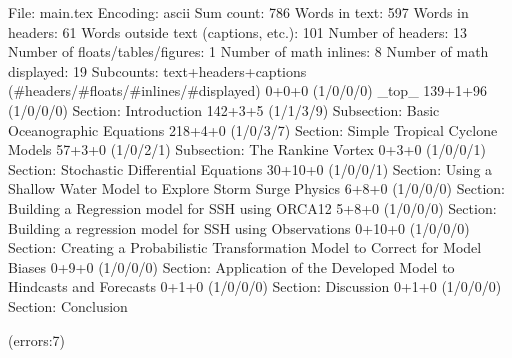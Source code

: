 
File: main.tex
Encoding: ascii
Sum count: 786
Words in text: 597
Words in headers: 61
Words outside text (captions, etc.): 101
Number of headers: 13
Number of floats/tables/figures: 1
Number of math inlines: 8
Number of math displayed: 19
Subcounts:
  text+headers+captions (#headers/#floats/#inlines/#displayed)
  0+0+0 (1/0/0/0) _top_
  139+1+96 (1/0/0/0) Section: Introduction
  142+3+5 (1/1/3/9) Subsection: Basic Oceanographic Equations
  218+4+0 (1/0/3/7) Section: Simple Tropical Cyclone Models
  57+3+0 (1/0/2/1) Subsection: The Rankine Vortex
  0+3+0 (1/0/0/1) Section: Stochastic Differential Equations
  30+10+0 (1/0/0/1) Section: Using a Shallow Water Model to Explore Storm Surge Physics
  6+8+0 (1/0/0/0) Section: Building a Regression model for SSH using ORCA12
  5+8+0 (1/0/0/0) Section: Building a regression model for SSH using Observations
  0+10+0 (1/0/0/0) Section: Creating a Probabilistic Transformation Model to Correct for Model Biases
  0+9+0 (1/0/0/0) Section: Application of the Developed Model to Hindcasts and Forecasts
  0+1+0 (1/0/0/0) Section: Discussion
  0+1+0 (1/0/0/0) Section: Conclusion

(errors:7)
